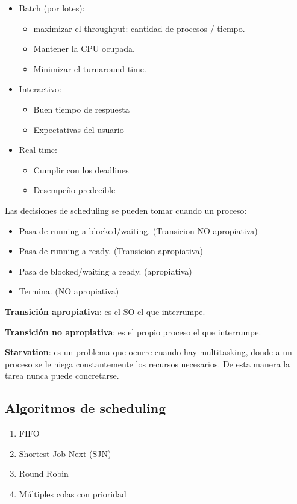 \documentclass[a4paper, twoside]{article}
\begin{document}
\begin{itemize}
	\item Batch (por lotes):
	\begin{itemize}
		\item maximizar el throughput: cantidad de procesos / tiempo.
		\item Mantener la CPU ocupada.
		\item Minimizar el turnaround time.
	\end{itemize}
	\item Interactivo:
	\begin{itemize}
		\item Buen tiempo de respuesta
		\item Expectativas del usuario
	\end{itemize}
	\item Real time:
	\begin{itemize}
		\item Cumplir con los deadlines
		\item Desempeño predecible
	\end{itemize}
\end{itemize}

Las decisiones de scheduling se pueden tomar cuando un proceso:

\begin{itemize}
	\item Pasa de running a blocked/waiting. (Transicion NO apropiativa)
	\item Pasa de running a ready. (Transicion apropiativa)
	\item Pasa de blocked/waiting a ready. (apropiativa)
	\item Termina. (NO apropiativa)
\end{itemize}

\textbf{Transición apropiativa}: es el SO el que interrumpe.

\textbf{Transición no apropiativa}: es el propio proceso el que interrumpe.

\textbf{Starvation}: es un problema que ocurre cuando hay multitasking, donde a un proceso se le niega constantemente los recursos necesarios. De esta manera la tarea nunca puede concretarse.

\subsection{Algoritmos de scheduling}

\begin{enumerate}
	\item FIFO
	\item Shortest Job Next (SJN)
	\item Round Robin
	\item Múltiples colas con prioridad
\end{enumerate}
\end{document}
